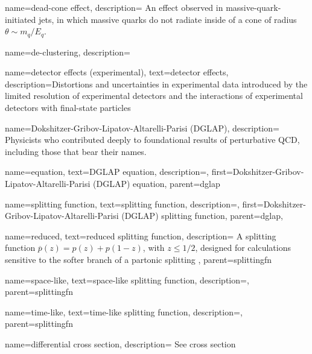 {
    name=dead-cone effect,
    description={
        An effect observed in massive-quark-initiated jets, in which massive quarks do not radiate inside of a cone of radius \(\theta \sim m_q/E_q\).
    }
}


{
    name=de-clustering,
    description={
    }
}



{
    name=detector effects (experimental),
    text=detector effects,
    description={Distortions and uncertainties in experimental data introduced by the limited resolution of experimental detectors and the interactions of experimental detectors with final-state particles}
}



{
    name=Dokshitzer-Gribov-Lipatov-Altarelli-Parisi (DGLAP),
    description={
        Physicists who contributed deeply to foundational results of perturbative QCD, including those that bear their names.
    }
}

    {
      name=equation,
      text=DGLAP equation,
      description={},
      first=Dokshitzer-Gribov-Lipatov-Altarelli-Parisi (DGLAP) equation,
      parent=dglap
    }

    {
      name=splitting function,
      text=splitting function,
      description={},
      first=Dokshitzer-Gribov-Lipatov-Altarelli-Parisi (DGLAP) splitting function,
      parent=dglap,
    }

        {
          name=reduced,
          text=reduced splitting function,
          description={
            A splitting function \(\overline{p}(z) = p(z) + p(1-z)\), with \(z \leq 1/2\), designed for calculations sensitive to the softer branch of a partonic splitting
          },
          parent=splittingfn
        }

        {
          name=space-like,
          text=space-like splitting function,
          description={},
          parent=splittingfn
        }

        {
          name=time-like,
          text=time-like splitting function,
          description={},
          parent=splittingfn
        }



{
    name=differential cross section,
    description={
        See cross section
    }
}


